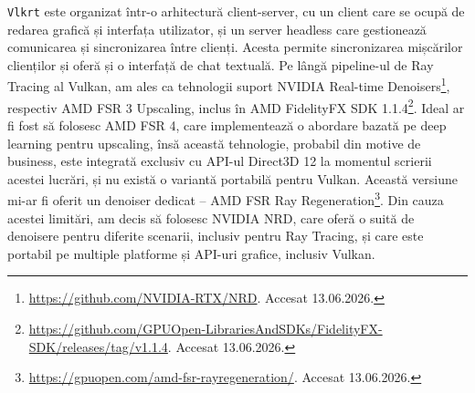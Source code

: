 \documentclass[12pt,a4paper]{report}
\numberwithin{equation}{section} %
\begin{document}
\texttt{Vlkrt} este organizat într-o arhitectură client-server, cu un client care se ocupă de redarea grafică și interfața utilizator, și un server headless care gestionează comunicarea și sincronizarea între clienți.
Acesta permite sincronizarea mișcărilor clienților și oferă și o interfață de chat textuală.
Pe lângă pipeline-ul de Ray Tracing al Vulkan, am ales ca tehnologii suport NVIDIA Real-time Denoisers\footnote{\label{nrd}\url{https://github.com/NVIDIA-RTX/NRD}. Accesat 13.06.2026.}, respectiv AMD FSR 3 Upscaling, inclus în AMD FidelityFX SDK 1.1.4\footnote{\url{https://github.com/GPUOpen-LibrariesAndSDKs/FidelityFX-SDK/releases/tag/v1.1.4}. Accesat 13.06.2026.}.
Ideal ar fi fost să folosesc AMD FSR 4, care implementează o abordare bazată pe deep learning pentru upscaling, însă această tehnologie, probabil din motive de business, este integrată exclusiv cu API-ul Direct3D 12 la momentul scrierii acestei lucrări, și nu există o variantă portabilă pentru Vulkan.
Această versiune mi-ar fi oferit un denoiser dedicat -- AMD FSR Ray Regeneration\footnote{\label{footnote:fsr_ray_regeneration}\url{https://gpuopen.com/amd-fsr-rayregeneration/}. Accesat 13.06.2026.}.
Din cauza acestei limitări, am decis să folosesc NVIDIA NRD, care oferă o suită de denoisere pentru diferite scenarii, inclusiv pentru Ray Tracing, și care este portabil pe multiple platforme și API-uri grafice, inclusiv Vulkan.
\end{document}
